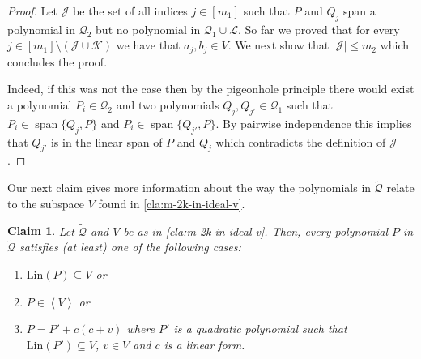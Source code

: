 \documentclass[10pt,a4paper]{article}
\newtheorem{claim}[theorem]{Claim}
\newcommand{\cJ}{{\mathcal{J}}}
\newcommand{\cK}{{\mathcal{K}}}
\newcommand{\calL}{{\mathcal{L}}}
\newcommand{\cQ}{{\mathcal{Q}}}
\newcommand{\ideal}[1]{\left \langle{#1}\right \rangle}
\newcommand{\spn}[1]{\operatorname{span}\{{#1}\}}
\newcommand{\MS}{\text{Lin}}
\begin{document}
\begin{proof}
Let $\cJ$ be the set of all indices $j\in [m_1]$ such that $P$ and $Q_j$ span a polynomial in $\cQ_2$ but no polynomial in $\cQ_1\cup \calL$. So far we proved that  for every $j\in [m_1]\setminus (\cJ\cup \cK)$ we have that $a_j,b_j\in V$. We next show that $|\cJ|\leq m_2$ which concludes the proof. 

Indeed, if this was not the case then by the pigeonhole principle there would exist a polynomial $P_i\in\cQ_2$ and two polynomials $Q_j,Q_{j'}\in\cQ_1 $ such that $P_i\in\spn{Q_j,P}$ and $P_i\in\spn{Q_{j'},P}$. By pairwise independence this implies that $Q_{j'}$ is in the linear span of $P$ and $Q_j$ which contradicts the definition of $\cJ$.
\end{proof}


Our next claim gives more information about the way the polynomials in $\tilde\cQ$ relate to the subspace $V$ found in \autoref{cla:m-2k-in-ideal-v}.

\begin{claim}\label{cla:mod-V}
Let $\tilde{\cQ}$ and $V$ be as in \autoref{cla:m-2k-in-ideal-v}. Then,  every polynomial $P$ in $\tilde{\cQ}$ satisfies (at least) one of the following cases:
\begin{enumerate}
\item $\MS(P)\subseteq V$ or
\item $P\in \ideal{V}$ or
\item  $P=P'+c(c + v)$ where $P'$ is a quadratic polynomial such that $\MS(P')\subseteq V$, $v\in V$ and $c$ is a linear form.
\end{enumerate}
\end{claim}
\end{document}
